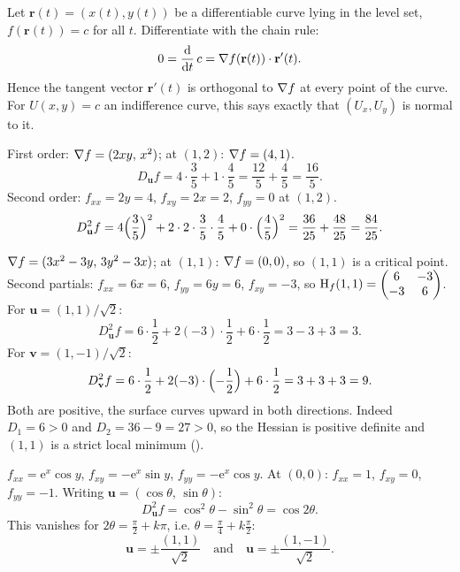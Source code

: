 \begin{solutions}
  \item Let $\mathbf{r}(t)=(x(t),y(t))$ be a differentiable curve lying
        in the level set, $f(\mathbf{r}(t))=c$ for all $t$.
        Differentiate with the chain rule:
        \[
          0=\frac{\mathrm{d}}{\mathrm{d}t}\,c=\nabla f(\mathbf{r}(t))\cdot\mathbf{r}'(t) .
        \]
        Hence the tangent vector $\mathbf{r}'(t)$ is orthogonal to
        $\nabla f$ at every point of the curve. For $U(x,y)=c$ an
        indifference curve, this says exactly that
        $(U_{x},U_{y})$ is normal to it.

  \item First order: $\nabla f=(2xy,\,x^{2})$; at $(1,2)$:
        $\nabla f=(4,1)$.
        \[
          D_{\mathbf{u}}f=4\cdot\frac{3}{5}+1\cdot\frac{4}{5}
            =\frac{12}{5}+\frac{4}{5}=\frac{16}{5} .
        \]
        Second order: $f_{xx}=2y=4$, $f_{xy}=2x=2$, $f_{yy}=0$ at
        $(1,2)$.
        \[
          D^{2}_{\mathbf{u}}f
            =4\Bigl(\frac{3}{5}\Bigr)^{2}
             +2\cdot 2\cdot\frac{3}{5}\cdot\frac{4}{5}
             +0\cdot\Bigl(\frac{4}{5}\Bigr)^{2}
            =\frac{36}{25}+\frac{48}{25}=\frac{84}{25} .
        \]

  \item $\nabla f=(3x^{2}-3y,\,3y^{2}-3x)$; at $(1,1)$:
        $\nabla f=(0,0)$, so $(1,1)$ is a critical point. Second
        partials: $f_{xx}=6x=6$, $f_{yy}=6y=6$, $f_{xy}=-3$, so
        $\operatorname{H}_{f}(1,1)=\begin{pmatrix}6&-3\\-3&6\end{pmatrix}$. For
        $\mathbf{u}=(1,1)/\sqrt{2}$:
        \[
          D^{2}_{\mathbf{u}}f=6\cdot\frac12
            +2(-3)\cdot\frac12+6\cdot\frac12=3-3+3=3 .
        \]
        For $\mathbf{v}=(1,-1)/\sqrt{2}$:
        \[
          D^{2}_{\mathbf{v}}f=6\cdot\frac12
            +2(-3)\cdot\Bigl(-\frac12\Bigr)+6\cdot\frac12=3+3+3=9 .
        \]
        Both are positive, the surface curves upward in both
        directions. Indeed $D_{1}=6>0$ and
        $D_{2}=36-9=27>0$, so the Hessian is positive definite and
        $(1,1)$ is a strict local minimum ().

  \item $f_{xx}=\mathrm{e}^{x}\cos y$, $f_{xy}=-\mathrm{e}^{x}\sin y$,
        $f_{yy}=-\mathrm{e}^{x}\cos y$. At $(0,0)$: $f_{xx}=1$,
        $f_{xy}=0$, $f_{yy}=-1$. Writing
        $\mathbf{u}=(\cos\theta,\,\sin\theta)$:
        \[
          D^{2}_{\mathbf{u}}f=\cos^{2}\theta-\sin^{2}\theta=\cos 2\theta .
        \]
        This vanishes for $2\theta=\tfrac{\pi}{2}+k\pi$, i.e.
        $\theta=\tfrac{\pi}{4}+k\tfrac{\pi}{2}$:
        \[
          \mathbf{u}=\pm\frac{(1,1)}{\sqrt{2}}
          \quad\text{and}\quad
          \mathbf{u}=\pm\frac{(1,-1)}{\sqrt{2}} .
        \]


\end{solutions}

